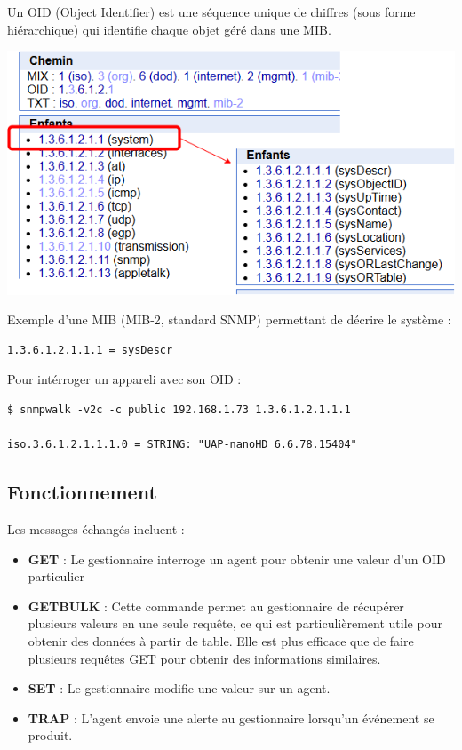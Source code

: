 \documentclass[french, 12pt]{article}%
\newcommand{\itemE}{\item[$\bullet$]}
\newcommand{\titreencadre}{Titre}
\newenvironment{encadre}[1]{\renewcommand{\titreencadre}{#1}
	\begin{mdframed}[style=encadrestyle]
	\vspace{0.5\baselineskip}
	}{%
	\end{mdframed}}
\begin{document}
\begin{encadre}{OID }
Un OID (Object Identifier) est une séquence unique de chiffres (sous forme hiérarchique) qui identifie chaque objet géré dans une MIB.
\end{encadre}

\begin{center}
\includegraphics[scale=0.5]{./ressource/exMib}
\end{center}

Exemple d’une MIB (MIB-2, standard SNMP) permettant de décrire le système :
\begin{lstlisting}[style=commande]
1.3.6.1.2.1.1.1 = sysDescr
\end{lstlisting}

Pour intérroger un appareli avec son OID : 
\begin{lstlisting}[style=commande]
$ snmpwalk -v2c -c public 192.168.1.73 1.3.6.1.2.1.1.1

iso.3.6.1.2.1.1.1.0 = STRING: "UAP-nanoHD 6.6.78.15404"
\end{lstlisting}
\subsection*{Fonctionnement}
Les messages échangés incluent :
\begin{itemize}
    \itemE \textbf{GET} : Le gestionnaire interroge un agent pour obtenir une valeur d'un OID particulier
    \itemE \textbf{GETBULK} : Cette commande permet au gestionnaire de récupérer plusieurs valeurs en une seule requête, ce qui est particulièrement utile pour obtenir des données à partir de table. Elle est plus efficace que de faire plusieurs requêtes GET pour obtenir des informations similaires.
    \itemE \textbf{SET} : Le gestionnaire modifie une valeur sur un agent.
    \itemE \textbf{TRAP} : L’agent envoie une alerte au gestionnaire lorsqu’un événement se produit.
\end{itemize}
\end{document}
